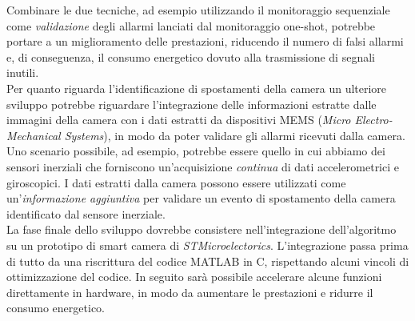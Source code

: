 Combinare le due tecniche, ad esempio utilizzando il monitoraggio sequenziale come \textit{validazione} degli allarmi lanciati dal monitoraggio one-shot, potrebbe portare a un miglioramento delle prestazioni, riducendo il numero di falsi allarmi e, di conseguenza, il consumo energetico dovuto alla trasmissione di segnali inutili.\\
Per quanto riguarda l'identificazione di spostamenti della camera un ulteriore sviluppo potrebbe riguardare l'integrazione delle informazioni estratte dalle immagini della camera con i dati estratti da dispositivi MEMS (\textit{Micro Electro-Mechanical Systems}), in modo da poter validare gli allarmi ricevuti dalla camera.
Uno scenario possibile, ad esempio, potrebbe essere quello in cui abbiamo dei sensori inerziali che forniscono un'acquisizione \textit{continua} di dati accelerometrici e giroscopici. 
I dati estratti dalla camera possono essere utilizzati come un'\textit{informazione aggiuntiva} per validare un evento di spostamento della camera identificato dal sensore inerziale.\\
La fase finale dello sviluppo dovrebbe consistere nell'integrazione dell'algoritmo su un prototipo di smart camera di \textit{STMicroelectorics}.
L'integrazione passa prima di tutto da una riscrittura del codice MATLAB in C, rispettando alcuni vincoli di ottimizzazione del codice.
In seguito sar\`a possibile accelerare alcune funzioni direttamente in hardware, in modo da aumentare le prestazioni e ridurre il consumo energetico.


